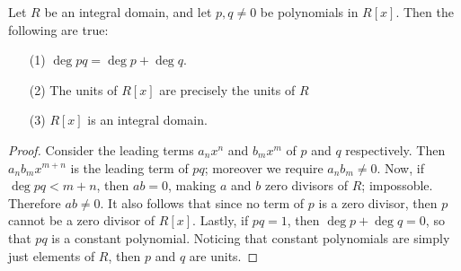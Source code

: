 \begin{theorem}\label{1.2.2}
    Let $R$ be an integral domain, and let  $p,q \neq 0$ be polynomials in
    $R[x]$. Then the following are true:
    \begin{enumerate}
        \item[(1)] $\deg{pq}=\deg{p}+\deg{q}$.

        \item[(2)] The units of $R[x]$ are precisely the units of $R$

        \item[(3)] $R[x]$ is an integral domain.
    \end{enumerate}
\end{theorem}
\begin{proof}
    Consider the leading terms $a_nx^n$ and  $b_mx^m$ of  $p$ and  $q$
    respectively. Then  $a_nb_mx^{m+n}$ is the leading term of $pq$; moreover we
    require $a_nb_m \neq 0$. Now, if $\deg{pq}<m+n$, then $ab=0$, making $a$ and
    $b$ zero divisors of  $R$; impossoble. Therefore  $ab \neq 0$. It also
    follows that since no term of $p$ is a zero divisor, then $p$ cannot be a
    zero divisor of  $R[x]$. Lastly, if $pq=1$, then $\deg{p}+\deg{q}=0$, so
    that $pq$ is a constant polynomial. Noticing that constant polynomials are
    simply just elements of $R$, then $p$ and $q$ are units.
\end{proof}
